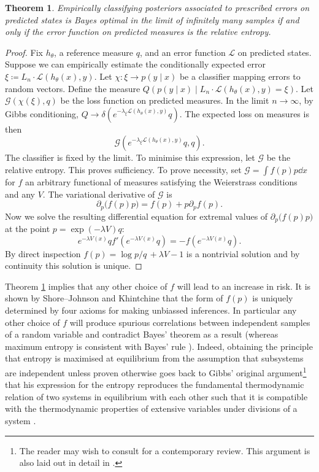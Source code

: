 \documentclass[11pt]{amsart}
\numberwithin{equation}{section}
\newtheorem{theorem}{Theorem}[section]
\theoremstyle{remark}
\theoremstyle{remark}
\newcommand{\lag}{\mathcal{L}}
\newcommand{\G}{\mathcal{G}}
\begin{document}
\begin{theorem}\label{max-ent-bayes-thm}
    Empirically classifying posteriors associated to prescribed errors on predicted states is Bayes optimal in the limit of infinitely many samples if and only if the error function on predicted measures is the relative entropy.
\end{theorem} 
\begin{proof}
    Fix $h_\theta$, a reference measure $q$, and an error function $\lag$ on predicted states. Suppose we can empirically estimate the conditionally expected error $\xi\coloneqq L_n \cdot \lag(h_\theta(x), y)$. Let $\chi \colon \xi \to p(y \mid x)$ be a classifier mapping errors to random vectors. Define the measure $Q(p(y \mid x) \mid L_n \cdot \lag(h_\theta(x), y) = \xi)$. Let $\G(\chi(\xi), q)$ be the loss function on predicted measures. In the limit $n \to \infty$, by Gibbs conditioning, $Q \to \delta\left(e^{-\lambda_\xi \lag(h_\theta(x), y)}q \right)$. The expected loss on measures is then 
    \[
        \G(e^{-\lambda_\xi \lag(h_\theta(x), y)}q, q).
    \]
    The classifier is fixed by the limit. To minimise this expression, let $\G$ be the relative entropy. This proves sufficiency. To prove necessity, set $\G = \int f(p) p \dd{x}$ for $f$ an arbitrary functional of measures satisfying the Weierstrass conditions and any $V$. The variational derivative of $\G$ is 
    \[
        \partial_p \big( f(p) p\big) = f(p) + p \partial_p f(p).
    \]
    Now we solve the resulting differential equation for extremal values of $\partial_p \big( f(p) p\big)$ at the point $p = \exp(-\lambda V)q$:
    \[
        e^{-\lambda V(x)}q f' \left(e^{-\lambda V(x)}q \right) = - f\left(e^{-\lambda V(x)}q \right).
    \]
    By direct inspection $f(p) = \log p/q\, + \lambda V - 1$ is a nontrivial solution and by continuity this solution is unique.
\end{proof}

Theorem \ref{max-ent-bayes-thm} implies that any other choice of $f$ will lead to an increase in risk. It is shown by Shore--Johnson \cite{shore1980axiomatic} and Khintchine \cite{aleksandr1957mathematical} that the form of $f(p)$ is uniquely determined by four axioms for making unbiassed inferences. In particular any other choice of $f$ will produce spurious correlations between independent samples of a random variable \cite{presse2013nonadditive} and contradict Bayes' theorem as a result \cite{presse2014nonadditive} (whereas maximum entropy is consistent with Bayes' rule \cite{jaynes1988relation}). Indeed, obtaining the principle that entropy is maximised at equilibrium from the assumption that subsystems are independent unless proven otherwise goes back to Gibbs' original argument\footnote{The reader may wish to consult \cite[\S 10]{emch2013logic} for a contemporary review. This argument is also laid out in detail in \cite{jaynes1965gibbs}.} that his expression for the entropy reproduces the fundamental thermodynamic relation of two systems in equilibrium with each other such that it is compatible with the thermodynamic properties of extensive variables under divisions of a system \cite[\S XIV]{gibbs1902elementary}.
\end{document}
